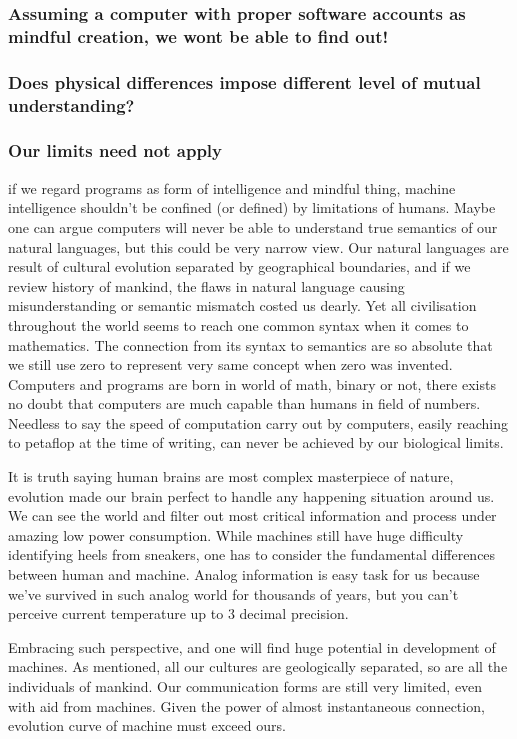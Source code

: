 \documentclass[11pt]{article}
\newenvironment{sketch}{\color{dark-green-2}}{\ignorespacesafterend}
\newenvironment{draft}{\color{dark-cornflower-blue-2}}{\ignorespacesafterend}
\begin{document}
\begin{sketch}
\subsubsection*{Assuming a computer with proper software accounts as mindful creation, we wont be able to find out!}

\subsubsection*{Does physical differences impose different level of mutual understanding?}
\end{sketch}

\subsubsection*{Our limits need not apply}
\begin{draft}

if we regard programs  as form of intelligence and mindful thing, machine intelligence shouldn't be confined (or defined) by limitations of humans. Maybe one can argue computers will never be able to understand true semantics of our natural languages, but this could be very narrow view. Our natural languages are result of cultural evolution separated by geographical boundaries, and if we review history of mankind, the flaws in natural language causing misunderstanding or semantic mismatch costed us dearly. Yet all civilisation throughout the world seems to reach one common syntax when it comes to mathematics. The connection from its syntax to semantics are so absolute that we still use zero to represent very same concept when zero was invented. Computers and programs are born in world of math, binary or not, there exists no doubt that computers are much capable than humans in field of numbers. Needless to say the speed of computation carry out by computers, easily reaching to petaflop at the time of writing, can never be achieved by our biological limits. 

It is truth saying human brains are most complex masterpiece of nature, evolution made our brain perfect to handle any happening situation around us. We can see the world and filter out most critical information and process under amazing low power consumption. While machines still have huge difficulty identifying heels from sneakers, one has to consider the fundamental differences between human and machine. Analog information is easy task for us because we've survived in such analog world for thousands of years, but you can't perceive current temperature up to 3 decimal precision. 

Embracing such perspective, and one will find huge potential in development of machines. As mentioned, all our cultures are geologically separated, so are all the individuals of mankind. Our communication forms are still very limited, even with aid from machines. Given the power of almost instantaneous connection, evolution curve of machine must exceed ours. 
\end{draft}




\end{document}
